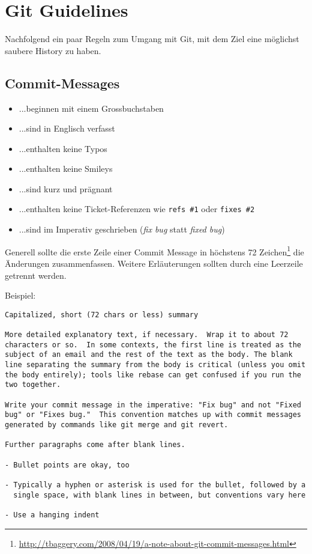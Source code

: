 \documentclass{article}
\begin{document}
\section{Git Guidelines}

Nachfolgend ein paar Regeln zum Umgang mit Git, mit dem Ziel eine möglichst
saubere History zu haben.

\subsection{Commit-Messages}

\begin{itemize}
	\item ...beginnen mit einem Grossbuchstaben
	\item ...sind in Englisch verfasst
	\item ...enthalten keine Typos
	\item ...enthalten keine Smileys
	\item ...sind kurz und prägnant
	\item ...enthalten keine Ticket-Referenzen wie \texttt{refs \#1} oder
		\texttt{fixes \#2}
	\item ...sind im Imperativ geschrieben (\textit{fix bug} statt \textit{fixed
		bug})
\end{itemize}

Generell sollte die erste Zeile einer Commit Message in höchstens 72
Zeichen\footnote{\url{http://tbaggery.com/2008/04/19/a-note-about-git-commit-messages.html}}
die Änderungen zusammenfassen. Weitere Erläuterungen sollten durch eine
Leerzeile getrennt werden.

Beispiel:

\begin{verbatim}
Capitalized, short (72 chars or less) summary

More detailed explanatory text, if necessary.  Wrap it to about 72
characters or so.  In some contexts, the first line is treated as the
subject of an email and the rest of the text as the body. The blank
line separating the summary from the body is critical (unless you omit
the body entirely); tools like rebase can get confused if you run the
two together.

Write your commit message in the imperative: "Fix bug" and not "Fixed
bug" or "Fixes bug."  This convention matches up with commit messages
generated by commands like git merge and git revert.

Further paragraphs come after blank lines.

- Bullet points are okay, too

- Typically a hyphen or asterisk is used for the bullet, followed by a
  single space, with blank lines in between, but conventions vary here

- Use a hanging indent
\end{verbatim}
\end{document}
